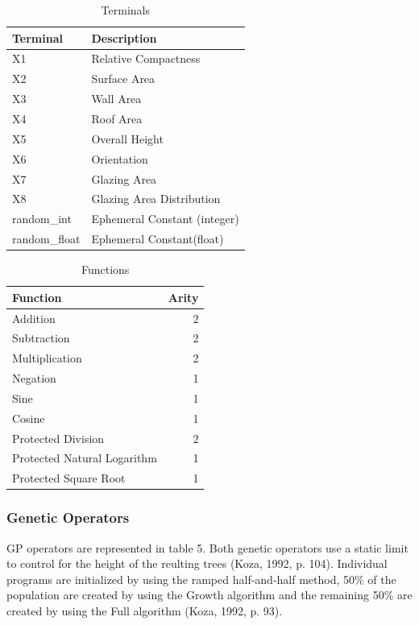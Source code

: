 \documentclass[
  12pt,
]{article}
\begin{document}
\begin{table}[!h]

\caption{\label{tab:unnamed-chunk-3}Terminals}
\centering
\begin{tabular}[t]{l|l}
\hline
\textbf{Terminal} & \textbf{Description}\\
\hline
X1 & Relative Compactness\\
\hline
X2 & Surface Area\\
\hline
X3 & Wall Area\\
\hline
X4 & Roof Area\\
\hline
X5 & Overall Height\\
\hline
X6 & Orientation\\
\hline
X7 & Glazing Area\\
\hline
X8 & Glazing Area Distribution\\
\hline
random\_int & Ephemeral Constant (integer)\\
\hline
random\_float & Ephemeral Constant(float)\\
\hline
\end{tabular}
\end{table}

\begin{table}[!h]

\caption{\label{tab:unnamed-chunk-4}Functions}
\centering
\begin{tabular}[t]{l|r}
\hline
\textbf{Function} & \textbf{Arity}\\
\hline
Addition & 2\\
\hline
Subtraction & 2\\
\hline
Multiplication & 2\\
\hline
Negation & 1\\
\hline
Sine & 1\\
\hline
Cosine & 1\\
\hline
Protected Division & 2\\
\hline
Protected Natural Logarithm & 1\\
\hline
Protected Square Root & 1\\
\hline
\end{tabular}
\end{table}

\hypertarget{genetic-operators}{%
\subsubsection{Genetic Operators}\label{genetic-operators}}

GP operators are represented in table 5. Both genetic operators use a
static limit to control for the height of the reulting trees (Koza,
1992, p. 104). Individual programs are initialized by using the ramped
half-and-half method, 50\% of the population are created by using the
Growth algorithm and the remaining 50\% are created by using the Full
algorithm (Koza, 1992, p. 93).
\end{document}
